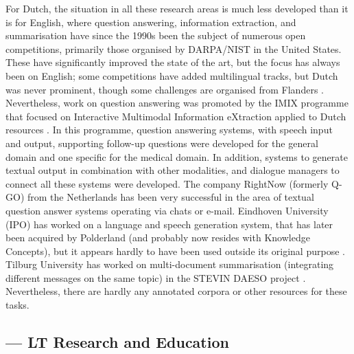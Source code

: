 \documentclass{scrartcl}
\begin{document}
\begin{Parallel}[c]{70mm}{70mm}
{    For Dutch, the situation in all these research areas is much less developed than it is for English, where question answering, information extraction, and summarisation have since the 1990s been the subject of numerous open competitions, primarily those organised by DARPA/NIST in the United States. These have significantly improved the state of the art, but the focus has always been on English; some competitions have added multilingual tracks, but Dutch was never prominent, though some challenges are organised from Flanders \cite{SemEval}.  Nevertheless, work on question answering was promoted by the IMIX programme that focused on Interactive Multimodal Information eXtraction applied to Dutch resources \cite{IMIX}.  In this programme, question answering systems, with speech input and output, supporting follow-up questions were developed for the general domain and one specific for the medical domain. In addition, systems to generate textual output in combination with other modalities, and dialogue managers to connect all these systems were developed. The company RightNow (formerly Q-GO) from the Netherlands has been very successful in the area of textual question answer systems operating via chats or e-mail.  Eindhoven University (IPO) has worked on a language and speech generation system, that has later been acquired by Polderland (and probably now resides with Knowledge Concepts), but it appears hardly to have been used outside its original purpose \cite{Theune:2003}.  Tilburg University has worked on multi-document summarisation (integrating different messages on the same topic) in the STEVIN DAESO project \cite{DAESO}.  Nevertheless, there are hardly any annotated corpora or other resources for these tasks.

      }

  \ParallelPar


  \subsection{  --- LT Research and Education }

  \MyParallelLText{

}

\end{Parallel}
\end{document}
